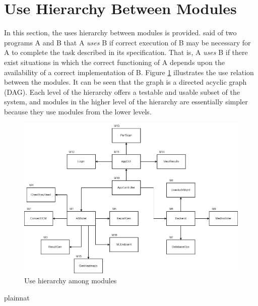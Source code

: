 \documentclass[12pt, titlepage]{article}
\begin{document}
\section{Use Hierarchy Between Modules} \label{SecUse}

In this section, the uses hierarchy between modules is
provided. \citet{Parnas1978} said of two programs A and B that A {\em uses} B if
correct execution of B may be necessary for A to complete the task described in
its specification. That is, A {\em uses} B if there exist situations in which
the correct functioning of A depends upon the availability of a correct
implementation of B.  Figure \ref{FigUH} illustrates the use relation between
the modules. It can be seen that the graph is a directed acyclic graph
(DAG). Each level of the hierarchy offers a testable and usable subset of the
system, and modules in the higher level of the hierarchy are essentially simpler
because they use modules from the lower levels.

\begin{figure}[H]
\centering
\includegraphics[width=1.0\textwidth]{UsesHierarchy.png}
\caption{Use hierarchy among modules}
\label{FigUH}
\end{figure}


 {plainnat}


\newpage{}
\end{document}
